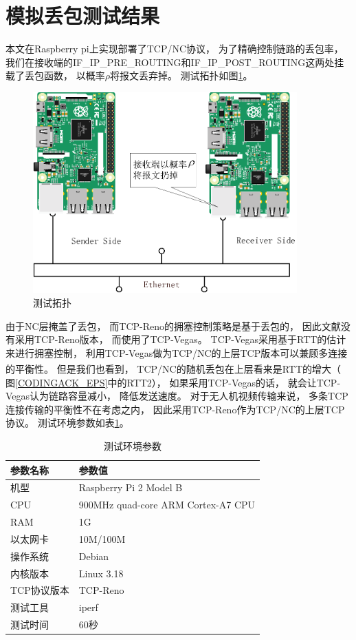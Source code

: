 \section{模拟丢包测试结果}\label{sec:monidiubaoceshijieguo}
本文在Raspberry pi上实现部署了TCP/NC协议，
为了精确控制链路的丢包率，
我们在接收端的IF\_IP\_PRE\_ROUTING和IF\_IP\_POST\_ROUTING这两处挂载了丢包函数，
以概率$\rho$将报文丢弃掉。
测试拓扑如图\ref{TUOPU_EPS}。
\begin{figure}[htbp]
	\centering
	\includegraphics[width=4in]{figures/tuopu.eps}
	\caption{测试拓扑}
	\label{TUOPU_EPS}
\end{figure}
\par
由于NC层掩盖了丢包，
而TCP-Reno的拥塞控制策略是基于丢包的，
因此文献\cite{Sundararajan2009}没有采用TCP-Reno版本，
而使用了TCP-Vegas。
TCP-Vegas采用基于RTT的估计来进行拥塞控制，
利用TCP-Vegas做为TCP/NC的上层TCP版本可以兼顾多连接的平衡性。
但是我们也看到，
TCP/NC的随机丢包在上层看来是RTT的增大\textsuperscript{\cite{Sundararajan2009}}（ 图\ref{CODINGACK_EPS}中的RTT2），
如果采用TCP-Vegas的话，
就会让TCP-Vegas认为链路容量减小，
降低发送速度。
对于无人机视频传输来说，
多条TCP连接传输的平衡性不在考虑之内，
因此采用TCP-Reno作为TCP/NC的上层TCP协议。
测试环境参数如表\ref{tab:CESHI}。
\begin{table}[htp]
	\centering
	\caption{测试环境参数}
	\label{tab:CESHI}
	\begin{tabular}{ll}
		\toprule
		参数名称&参数值\tabularnewline
		\midrule
		机型		&Raspberry Pi 2 Model B\tabularnewline
		CPU		&900MHz quad-core ARM Cortex-A7 CPU\tabularnewline
		RAM			&1G\tabularnewline
		以太网卡 	&10M/100M\tabularnewline
		操作系统 &Debian\tabularnewline
		内核版本 &Linux 3.18\tabularnewline
		TCP协议版本 &TCP-Reno\tabularnewline
		测试工具 &iperf\tabularnewline
		测试时间 &60秒\tabularnewline
		\bottomrule
	\end{tabular}
\end{table}
